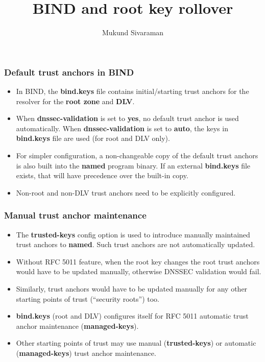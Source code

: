 \documentclass{beamer}
\title{BIND and root key rollover}
\author{Mukund Sivaraman}
\institute{Internet Systems Consortium}
\date{}
\begin{document}
\frame{\titlepage}

\frame
{
  \frametitle{Default trust anchors in BIND}

  \begin{itemize}

  \item In BIND, the \textbf{bind.keys} file contains initial/starting
    trust anchors for the resolver for the \textbf{root zone} and
    \textbf{DLV}.

  \item When \textbf{dnssec-validation} is set to \textbf{yes}, no
    default trust anchor is used automatically. When
    \textbf{dnssec-validation} is set to \textbf{auto}, the keys in
    \textbf{bind.keys} file are used (for root and DLV only).

  \item For simpler configuration, a non-changeable copy of the default
    trust anchors is also built into the \textbf{named} program
    binary. If an external \textbf{bind.keys} file exists, that will
    have precedence over the built-in copy.

  \item Non-root and non-DLV trust anchors need to be explicitly
    configured.

  \end{itemize}
}

\frame
{
  \frametitle{Manual trust anchor maintenance}

  \begin{itemize}
  \item The \textbf{trusted-keys} config option is used to introduce
    manually maintained trust anchors to \textbf{named}. Such trust
    anchors are not automatically updated.

  \item Without RFC 5011 feature, when the root key changes the root
    trust anchors would have to be updated manually, otherwise DNSSEC
    validation would fail.

  \item Similarly, trust anchors would have to be updated manually for
    any other starting points of trust (``security roots'') too.

  \item \textbf{bind.keys} (root and DLV) configures itself for RFC 5011
    automatic trust anchor maintenance (\textbf{managed-keys}).

  \item Other starting points of trust may use manual
    (\textbf{trusted-keys}) or automatic (\textbf{managed-keys}) trust
    anchor maintenance.

  \end{itemize}
}
\end{document}
